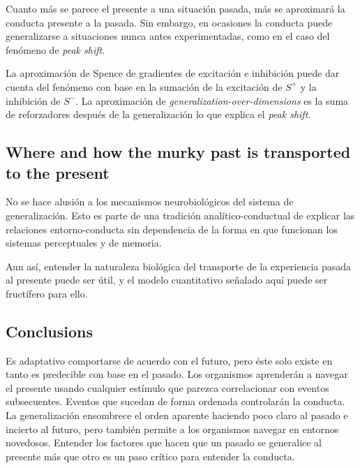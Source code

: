 \documentclass[a4paper,12pt]{article}
\begin{document}
Cuanto más se parece el presente a una situación pasada, más se aproximará la conducta presente a la pasada. Sin embargo, en ocasiones la conducta puede generalizarse a situaciones nunca antes experimentadas, como en el caso del fenómeno de {\itshape peak shift}.

La aproximación de Spence de gradientes de excitación e inhibición puede dar cuenta del fenómeno con base en la sumación de la excitación de $S^{+}$ y la inhibición de $S^{-}$. La aproximación de {\itshape generalization-over-dimensions} es la suma de reforzadores después de la generalización lo que explica el {\itshape peak shift}.

\subsection{Where and how the murky past is transported to the present}

No se hace alusión a los mecanismos neurobiológicos del sistema de generalización. Esto es parte de una tradición analítico-conductual de explicar las relaciones entorno-conducta sin dependencia de la forma en que funcionan los sistemas perceptuales y de memoria.

Aun así, entender la naturaleza biológica del transporte de la experiencia pasada al presente puede ser útil, y el modelo cuantitativo señalado aquí puede ser fructífero para ello.

\subsection{Conclusions}

Es adaptativo comportarse de acuerdo con el futuro, pero éste solo existe en tanto es predecible con base en el pasado. Los organismos aprenderán a navegar el presente usando cualquier estímulo que parezca correlacionar con eventos subsecuentes. Eventos que sucedan de forma ordenada controlarán la conducta. La generalización ensombrece el orden aparente haciendo poco claro al pasado e incierto al futuro, pero también permite a los organismos navegar en entornos novedosos. Entender los factores que hacen que un pasado se generalice al presente más que otro es un paso crítico para entender la conducta.
\end{document}
